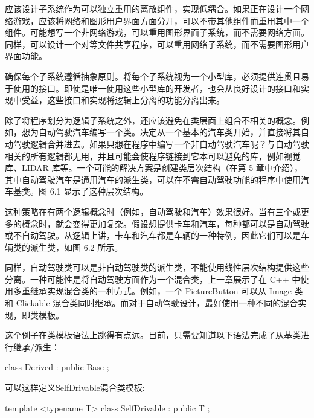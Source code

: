 
应该设计子系统作为可以独立重用的离散组件，实现低耦合。如果正在设计一个网络游戏，应该将网络和图形用户界面方面分开，可以不带其他组件而重用其中一个组件。可能想写一个非网络游戏，可以重用图形界面子系统，而不需要网络方面。同样，可以设计一个对等文件共享程序，可以重用网络子系统，而不需要图形用户界面功能。

确保每个子系统遵循抽象原则。将每个子系统视为一个小型库，必须提供连贯且易于使用的接口。即使是唯一使用这些小型库的开发者，也会从良好设计的接口和实现中受益，这些接口和实现将逻辑上分离的功能分离出来。


除了将程序划分为逻辑子系统之外，还应该避免在类层面上组合不相关的概念。例如，想为自动驾驶汽车编写一个类。决定从一个基本的汽车类开始，并直接将其自动驾驶逻辑合并进去。如果只想在程序中编写一个非自动驾驶汽车呢？与自动驾驶相关的所有逻辑都无用，并且可能会使程序链接到它本可以避免的库，例如视觉库、LIDAR 库等。一个可能的解决方案是创建类层次结构（在第 5 章中介绍），其中自动驾驶汽车是通用汽车的派生类，可以在不需自动驾驶功能的程序中使用汽车基类。图 6.1 显示了这种层次结构。


这种策略在有两个逻辑概念时（例如，自动驾驶和汽车）效果很好。当有三个或更多的概念时，就会变得更加复杂。假设想提供卡车和汽车，每种都可以是自动驾驶或不自动驾驶。从逻辑上讲，卡车和汽车都是车辆的一种特例，因此它们可以是车辆类的派生类，如图 6.2 所示。


同样，自动驾驶类可以是非自动驾驶类的派生类，不能使用线性层次结构提供这些分离。一种可能性是将自动驾驶方面作为一个混合类，上一章展示了在 C++ 中使用多重继承实现混合类的一种方式。例如，一个 PictureButton 可以从 Image 类和 Clickable 混合类同时继承。而对于自动驾驶设计，最好使用一种不同的混合实现，即类模板。

这个例子在类模板语法上跳得有点远。目前，只需要知道以下语法完成了从基类进行继承/派生：

\begin{cpp}
class Derived : public Base {};
\end{cpp}

可以这样定义SelfDrivable混合类模板:

\begin{cpp}
template <typename T>
class SelfDrivable : public T
{
};
\end{cpp}

